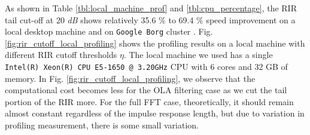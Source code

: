 \documentclass{article}
\begin{document}
As shown in Table \ref{tbl:local_machine_prof} and \ref{tbl:cpu_percentage},
the RIR tail cut-off at 20 \textit{dB} shows relatively 35.6 \% to 69.4 \%
speed improvement on a local desktop machine and on \texttt{Google Borg}
cluster \cite{A_Verma_eurosys_2015_1}.
Fig. \ref{fig:rir_cutoff_local_profiling} shows the profiling results
on a local machine with different RIR cutoff thresholds $\eta$.
The local machine we used has a single \texttt{Intel(R) Xeon(R) CPU E5-1650 @ 3.20GHz}
CPU with 6 cores and 32 GB of memory. In Fig. \ref{fig:rir_cutoff_local_profiling},
we observe that the computational cost becomes less for the OLA filtering
case as we cut the tail portion of the RIR more. For the full FFT case,
theoretically, it should remain almost constant regardless of the
impulse response length, but due to variation
in profiling measurement, there is some small variation.
%
%
%
\end{document}
